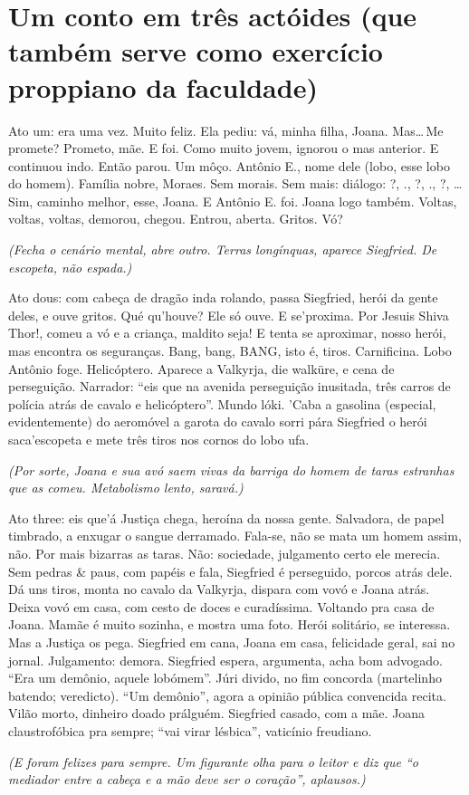 \chapter[Um conto em três actóides]{Um conto em três actóides (que também serve como exercício proppiano da faculdade)}

Ato um: era uma vez. Muito feliz. Ela pediu: vá, minha filha, Joana. Mas\ldots\,Me promete? Prometo, mãe. E foi. Como muito jovem, ignorou o mas anterior. E continuou indo. Então parou. Um môço. Antônio E., nome dele (lobo, esse lobo do homem). Família nobre, Moraes. Sem morais. Sem mais: diálogo: ?, ., ?, ., ?, \ldots\,Sim, caminho melhor, esse, Joana. E Antônio E. foi. Joana logo também. Voltas, voltas, voltas, demorou, chegou. Entrou, aberta. Gritos. Vó?

\begin{center}
\emph{(Fecha o cenário mental, abre outro. Terras longínquas, aparece Siegfried. De escopeta, não espada.)}
\end{center}

Ato dous: com cabeça de dragão inda rolando, passa Siegfried, herói da gente deles, e ouve gritos. Qué qu'houve? Ele só ouve. E se'proxima. Por Jesuis Shiva Thor!, comeu a vó e a criança, maldito seja! E tenta se aproximar, nosso herói, mas encontra os seguranças. Bang, bang, BANG, isto é, tiros. Carnificina. Lobo Antônio foge. Helicóptero. Aparece a Valkyrja, die walküre, e cena de perseguição. Narrador: ``eis que na avenida perseguição inusitada, três carros de polícia atrás de cavalo e helicóptero''. Mundo lóki. 'Caba a gasolina (especial, evidentemente) do aeromóvel a garota do cavalo sorri pára Siegfried o herói saca'escopeta e mete três tiros nos cornos do lobo ufa.

\begin{center}
\emph{(Por sorte, Joana e sua avó saem vivas da barriga do homem de taras estranhas que as comeu. Metabolismo lento, saravá.)}
\end{center}

\begin{sloppypar}
Ato \foreignlanguage{english}{three}: eis que'á Justiça chega, heroína da nossa gente. Salvadora, de papel timbrado, a enxugar o sangue derramado. Fala-se, não se mata um homem assim, não. Por mais bizarras as taras. Não: sociedade, julgamento certo ele merecia. Sem pedras \& paus, com papéis e fala, Siegfried é perseguido, porcos atrás dele. Dá uns tiros, monta no cavalo da Valkyrja, dispara com vovó e Joana atrás. Deixa vovó em casa, com cesto de doces e curadíssima. Voltando pra casa de Joana. Mamãe é muito sozinha, e mostra uma foto. Herói solitário, se interessa. Mas a Justiça os pega. Siegfried em cana, Joana em casa, felicidade geral, sai no jornal. Julgamento: demora. Siegfried espera, argumenta, acha bom advogado. ``Era um demônio, aquele lobómem''. Júri divido, no fim concorda (martelinho batendo; veredicto). ``Um demônio'', agora a opinião pública convencida recita. Vilão morto, dinheiro doado prálguém. Siegfried casado, com a mãe. Joana claustrofóbica pra sempre; ``vai virar lésbica'', vaticínio freudiano.
\end{sloppypar}

\begin{center}
\emph{(E foram felizes para sempre. Um figurante olha para o leitor e diz que ``o mediador entre a cabeça e a mão deve ser o coração'', aplausos.)}
\end{center}
